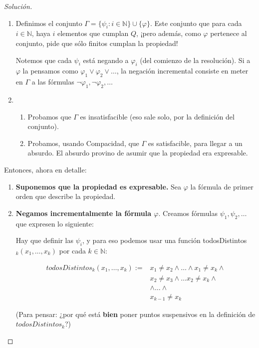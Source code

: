 \documentclass[10pt,a4paper]{article}
\def\key#1{\{#1\}}
\def\N{\mathbb{N}}
\def\p{\psi}
\newenvironment{solution}
  {\renewcommand\qedsymbol{$\blacksquare$}\begin{proof}[Solución]}
  {\end{proof}}
\begin{document}
\begin{solution}
\begin{enumerate}
\begin{itemize}
  	\end{itemize}
  
  \item Definimos el conjunto $\Gamma = \key{\p_i : i \in \N} \cup \key{\varphi}$. Este conjunto  que para cada $i \in \N$, haya $i$ elementos que cumplan $Q$, ¡pero además, como $\varphi$ pertenece al conjunto, pide que sólo finitos cumplan la propiedad!
  
  	Notemos que cada $\p_i$ está negando a $\varphi_i$ (del comienzo de la resolución). Si a $\varphi$ la pensamos como $\varphi_1 \lor \varphi_2 \lor \dots$, la negación incremental consiste en meter en $\Gamma$ a las fórmulas $\neg \varphi_1, \neg \varphi_2, \dots$
  
  \item 
	\begin{enumerate}[label=\alph*)]
		\item Probamos que $\Gamma$ es insatisfacible (eso sale solo, por la definición del conjunto).
		\item Probamos, usando Compacidad, que $\Gamma$ es satisfacible, para llegar a un absurdo. El absurdo provino de asumir que la propiedad era expresable.
	\end{enumerate}  
\end{enumerate}

Entonces, ahora en detalle:

\begin{enumerate}
	\item \textbf{Suponemos que la propiedad es expresable.} Sea $\varphi$ la fórmula de primer orden que describe la propiedad.
  	\item \textbf{Negamos incrementalmente la fórmula $\varphi$}. Creamos fórmulas $\p_1, \p_2, \dots$ que expresen lo siguiente:
  	
  Hay que definir las $\p_i$, y para eso podemos usar una función todosDistintos$_k(x_1,\dots,x_k)$ por cada $k\in \N$:

\begin{align*}
todosDistintos_k(x_1,\dots,x_k) := &x_1 \neq  x_2 \land \dots \land x_1 \neq x_k \land\\
&x_2 \neq x_3 \land \dots x_2 \neq x_k \land\\
&\land \dots \land\\
&x_{k-1} \neq x_k
\end{align*}

(Para pensar: ¿por qué está \textbf{bien} poner puntos suspensivos en la definición de $todosDistintos_k$?)


\end{enumerate}
\end{solution}
\end{document}
